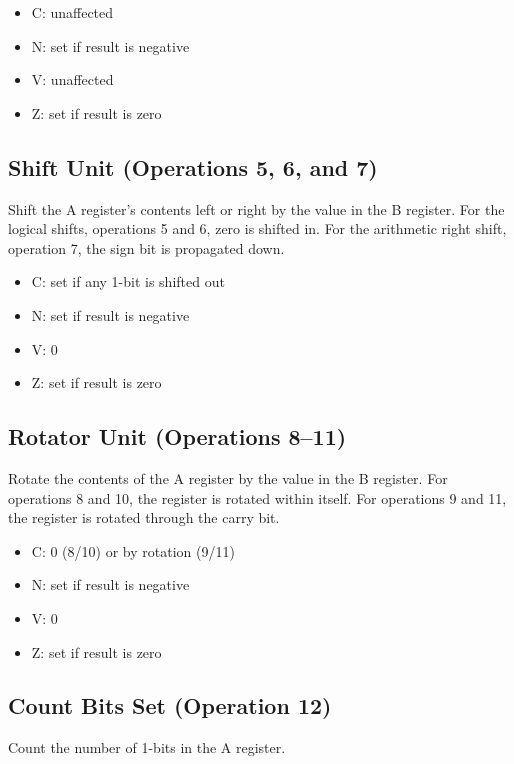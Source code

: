 \documentclass[11pt]{book}
\begin{document}
\begin{multicols}{2}
  \begin{itemize}
  \item C: unaffected
  \item N: set if result is negative
  \item V: unaffected
  \item Z: set if result is zero
  \end{itemize}
\end{multicols}

\subsection{Shift Unit (Operations 5, 6, and 7)}
Shift the A register's contents left or right
by the value in the B register.
For the logical shifts, operations 5 and 6,
zero is shifted in.
For the arithmetic right shift, operation 7,
the sign bit is propagated down.

\begin{multicols}{2}
  \begin{itemize}
  \item C: set if any 1-bit is shifted out
  \item N: set if result is negative
  \item V: 0
  \item Z: set if result is zero
  \end{itemize}
\end{multicols}

\subsection{Rotator Unit (Operations 8--11)}
Rotate the contents of the A register
by the value in the B register.
For operations 8 and 10,
the register is rotated within itself.
For operations 9 and 11,
the register is rotated through the carry bit.

\begin{multicols}{2}
  \begin{itemize}
  \item C: 0 (8/10) or by rotation (9/11)
  \item N: set if result is negative
  \item V: 0
  \item Z: set if result is zero
  \end{itemize}
\end{multicols}

\subsection{Count Bits Set (Operation 12)}
Count the number of 1-bits in the A register.
\end{document}
